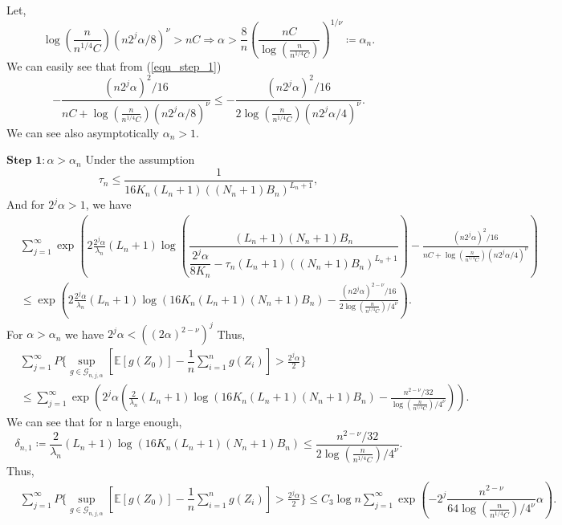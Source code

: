 \documentclass[10pt,twoside]{article}
\numberwithin{equation}{section}
\newcommand{\E}{\ensuremath{\mathbb{E}}}
\begin{document}
%
%
Let, 
%
\begin{equation}\label{equ_step_1}
\log(\frac{n}{n^ {1/4} C})(n 2^j \alpha /8)^ {\nu} > n C \Longrightarrow \alpha > \frac{8}{n}\left(\frac{n C}{\log(\frac{n}{n^ {1/4} C})}\right)^ {1/\nu} \coloneqq \alpha_{n}.  
\end{equation}
%
We can easily see that from (\ref{equ_step_1}) 
%
\begin{equation*}
 -\frac{(n 2^j \alpha)^ {2} /16}{n C  + \log(\frac{n}{n^ {1/4} C})(n 2^j \alpha /8)^ {\nu}} \leq -\frac{(n 2^j \alpha)^ {2} /16}{2\log(\frac{n}{n^ {1/4} C})(n 2^j \alpha/4)^ {\nu}}.  
\end{equation*}
%
We can see also asymptotically $\alpha_{n} > 1$. 


%
\noindent$\textbf{Step 1}: \alpha > \alpha_n$ 
%
%
Under the assumption 
%
\[ \tau_n \leq \dfrac{1}{16 K_n  (L_n + 1)((N_n + 1) B_n)^{L_n +1}}, \]
%
%
And for  $2^j \alpha >1$, we have
%
\begin{align}
 \nonumber & \sum_{j=1}^ {\infty} \exp\left( 2 \frac{2^j \alpha}{\lambda_n}(L_n + 1) \log \left( \dfrac{(L_n + 1)(N_n + 1) B_n}{\dfrac{2^j \alpha}{8 K_n} - \tau_n (L_n + 1)((N_n + 1) B_n)^{L_n +1}}  \right)  -\frac{(n 2^j \alpha)^ {2} /16}{n C + \log(\frac{n}{n^ {1/4} C})(n 2^j \alpha/4)^ {\nu}}  \right) 
 \\
  & \leq    \exp \left(2 \frac{2^j \alpha}{\lambda_n}(L_n + 1) \log \left( 16 K_n (L_n + 1)(N_n + 1) B_n  \right)  -\frac{(n 2^j \alpha)^ {2-\nu} /16}{2 \log(\frac{n}{n^ {1/4} C}) /4^ {\nu}} \right).
\end{align}
%
%
For $\alpha > \alpha_n$  we have $ 2^j \alpha  < ((2 \alpha)^{2-\nu})^j$
%
Thus,
%
\begin{align}
\nonumber & \sum_{j=1}^ {\infty} P\Big\{\underset{ g \in \mathcal{G}_ {n, j, \alpha}}{\sup} \left[\E [g (Z_0)] - \dfrac{1}{n} \sum_{i=1}^n g (Z_i) \right] >  \frac{2^j \alpha}{2} \Big\}  
\\
& \leq \sum_{j=1}^ {\infty} \exp\left( 2^j \alpha \left(\frac{2} {\lambda_n}(L_n + 1) \log \left(16 K_n (L_n + 1)(N_n + 1) B_n  \right)  -\frac{n^ {2-\nu} /32}{\log(\frac{n}{n^ {1/4} C}) /4^ {\nu}} \right) \right).
\end{align}
%
We can see that for n large enough,
%
\[  \delta_{n, 1} \coloneqq \frac{2}{\lambda_{n}}(L_{n} + 1)\log\left(16 K_{n}(L_{n} + 1)(N_{n} + 1)B_{n}  \right)  \leq \frac{n^ {2-\nu} /32}{2\log(\frac{n}{n^ {1/4} C})/4^{\nu}}. \] 
%
Thus,
%
\begin{align}
\nonumber & \sum_{j=1}^ {\infty} P\Big\{\underset{ g \in \mathcal{G}_ {n, j, \alpha}}{\sup} \left[\E [g (Z_0)] - \dfrac{1}{n} \sum_{i=1}^n g (Z_i) \right] >  \frac{2^j \alpha}{2} \Big\}  \leq C_3 \log n \sum_{j=1}^ {\infty} \exp\left( -2^j \dfrac{n^ {2-\nu}}{64 \log(\frac{n}{n^ {1/4} C})/4^ {\nu}} \alpha \right).
\end{align}
\end{document}
